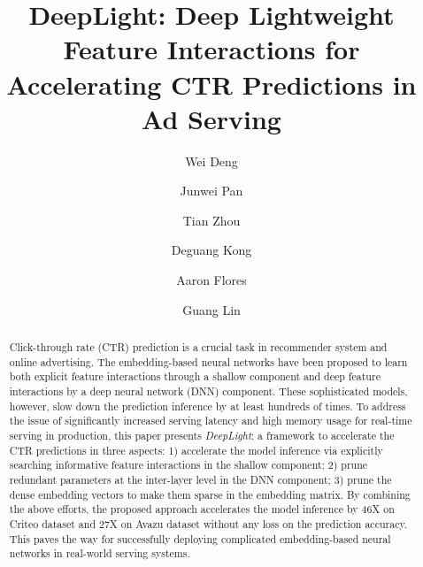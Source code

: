 \documentclass[sigconf]{acmart}
\begin{document}
\title{DeepLight: Deep Lightweight Feature Interactions for Accelerating CTR Predictions in Ad Serving}


\author{Wei Deng}

\author{Junwei Pan}
\authornotemark[1]

\author{Tian Zhou}

\author{Deguang Kong}
\authornotemark[2]

\author{Aaron Flores}

\author{Guang Lin}



\begin{abstract}


Click-through rate (CTR) prediction is a crucial task in recommender system and online advertising. The embedding-based neural networks have been proposed to learn both explicit feature interactions through a shallow component and deep feature interactions by a deep neural network (DNN) component. These sophisticated models, however, slow down the prediction
inference by at least hundreds of times. To address the issue of significantly increased serving latency and high memory usage for real-time serving in production, this paper presents \emph{DeepLight}: a 
framework to accelerate the CTR predictions in three aspects: 1) accelerate the model inference via explicitly searching informative feature interactions in the shallow component; 2) prune redundant parameters at the inter-layer level in the DNN component; 3) prune the dense embedding vectors to make them sparse in the embedding matrix. By combining the above efforts, the proposed approach accelerates the model inference by 46X on Criteo dataset and 27X on Avazu dataset without any loss on the prediction accuracy. This paves the way for successfully deploying complicated embedding-based neural networks in real-world serving systems. 


  
\end{abstract}
\end{document}
